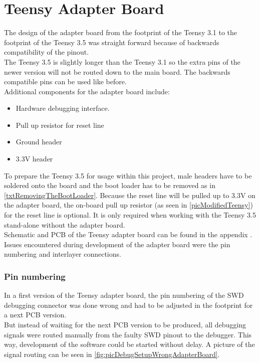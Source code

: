 \section{Teensy Adapter Board} \label{sec:txtTeensyAdapterBoard}
The design of the adapter board from the footprint of the Teensy 3.1 to the footprint of the Teensy 3.5 was straight forward because of backwards compatibility of the pinout.\\
The Teensy 3.5 is slightly longer than the Teensy 3.1 so the extra pins of the newer version will not be routed down to the main board. The backwards compatible pins can be used like before.\\
Additional components for the adapter board include:
\begin{itemize}
    \item Hardware debugging interface.
    \item Pull up resistor for reset line
    \item Ground header
    \item 3.3V header
\end{itemize}
To prepare the Teensy 3.5 for usage within this project, male headers have to be soldered onto the board and the boot loader has to be removed as in \ref{txtRemovingTheBootLoader}. Because the reset line will be pulled up to 3.3V on the adapter board, the on-board pull up resistor (as seen in \autoref{picModifiedTeensy}) for the reset line is optional. It is only required when working with the Teensy 3.5 stand-alone without the adapter board.\\
Schematic and PCB of the Teensy adapter board can be found in the appendix .\\
Issues encountered during development of the adapter board were the pin numbering and interlayer connections.
\subsubsection{Pin numbering}
In a first version of the Teensy adapter board, the pin numbering of the SWD debugging connector was done wrong and had to be adjusted in the footprint for a next PCB version.\\
But instead of waiting for the next PCB version to be produced, all debugging signals were routed manually from the faulty SWD pinout to the debugger. This way, development of the software could be started without delay. A picture of the signal routing can be seen in \autoref{fig:picDebugSetupWrongAdapterBoard}.
